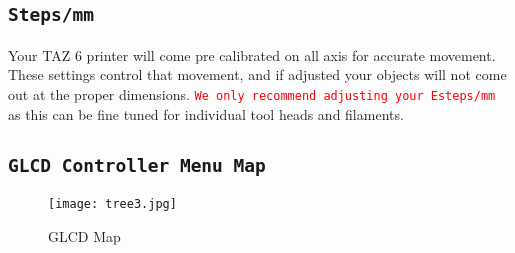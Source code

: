 \subsection{\texttt{Steps/mm}}
Your TAZ 6 printer will come pre calibrated on all axis for accurate movement. These settings control that movement, and if adjusted your objects will not come out at the proper dimensions. \textcolor{red}{\texttt{We only recommend adjusting your Esteps/mm}} as this can be fine tuned for individual tool heads and filaments. 

\subsection{\texttt{GLCD Controller Menu Map}}
\begin{figure}[H]
\centering
\texttt{[image: tree3.jpg]}
\caption{GLCD Map}
\label{fig:GLCD_Map}
\end{figure}




